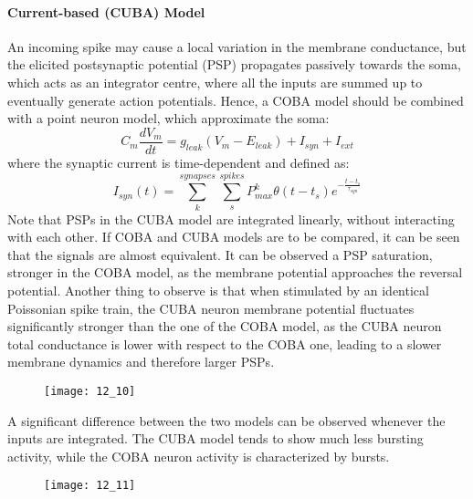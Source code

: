 \paragraph{Current-based (CUBA) Model}
An incoming spike may cause a local variation in the membrane conductance, but the
elicited postsynaptic potential (PSP) propagates passively towards the soma,
which acts as an integrator centre, where all the inputs are summed up
to eventually generate action potentials. Hence, a COBA model
should be combined with a point neuron model, which approximate the soma:
\begin{equation*}
    C_{m}\frac{dV_{m}}{dt}=g_{leak}(V_{m}-E_{leak})+I_{syn}+I_{ext}
\end{equation*}
where the synaptic current is time-dependent and defined as:
\begin{equation*}
    I_{syn}(t)=\sum_{k}^{synapses}\sum_{s}^{spikes}P_{max}^{k}\theta{(t-t_{s})}e^{-\frac{t-t_{s}}{\tau_{syn}}}
\end{equation*}
Note that PSPs in the CUBA model are integrated linearly, without
interacting with each other.
\pagebreak
If COBA and CUBA models are to be compared, it can be seen that the
signals are almost equivalent. It can be observed a PSP
saturation, stronger in the COBA model, as the membrane
potential approaches the reversal potential. Another thing to observe
is that when stimulated by an identical Poissonian spike train,
the CUBA neuron membrane potential fluctuates significantly
stronger than the one of the COBA model, as the CUBA neuron
total conductance is lower with respect to the COBA one,
leading to a slower membrane dynamics and therefore larger PSPs.
\begin{figure}[H]
    \texttt{[image: 12\_10]}
    \centering
\end{figure}
A significant difference between the two models can be observed whenever the
inputs are integrated. The CUBA model tends to show much less bursting activity,
while the COBA neuron activity is characterized by bursts.
\begin{figure}[H]
    \texttt{[image: 12\_11]}
    \centering
\end{figure}